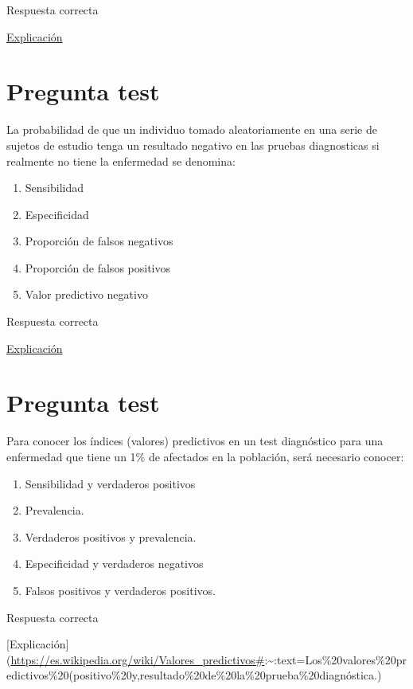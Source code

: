 \documentclass[
]{book}
\providecommand{\tightlist}{%
  \setlength{\itemsep}{0pt}\setlength{\parskip}{0pt}}
\begin{document}
Respuesta correcta

\href{https://1fjmanzano.github.io/bioestadistica/relaci\%C3\%B3n-entre-variables-cualitativas.html\#diagno\%CC\%81stico-cli\%CC\%81nico}{Explicación}

\hypertarget{pregunta-test-98}{%
\section{Pregunta test}\label{pregunta-test-98}}

La probabilidad de que un individuo tomado aleatoriamente en una serie de sujetos de estudio tenga un resultado negativo en las pruebas diagnosticas si realmente no tiene la enfermedad se denomina:

\begin{enumerate}
\def\labelenumi{\alph{enumi})}
\tightlist
\item
  Sensibilidad
\item
  Especificidad
\item
  Proporción de falsos negativos
\item
  Proporción de falsos positivos
\item
  Valor predictivo negativo
\end{enumerate}

Respuesta correcta

\href{https://1fjmanzano.github.io/bioestadistica/relaci\%C3\%B3n-entre-variables-cualitativas.html\#diagno\%CC\%81stico-cli\%CC\%81nico}{Explicación}

\hypertarget{pregunta-test-99}{%
\section{Pregunta test}\label{pregunta-test-99}}

Para conocer los índices (valores) predictivos en un test diagnóstico para una enfermedad que tiene un 1\% de afectados en la población, será necesario conocer:

\begin{enumerate}
\def\labelenumi{\alph{enumi})}
\tightlist
\item
  Sensibilidad y verdaderos positivos
\item
  Prevalencia.
\item
  Verdaderos positivos y prevalencia.
\item
  Especificidad y verdaderos negativos
\item
  Falsos positivos y verdaderos positivos.
\end{enumerate}

Respuesta correcta

{[}Explicación{]}(\url{https://es.wikipedia.org/wiki/Valores_predictivos\#}:\textasciitilde:text=Los\%20valores\%20predictivos\%20(positivo\%20y,resultado\%20de\%20la\%20prueba\%20diagnóstica.)

  
\end{document}
